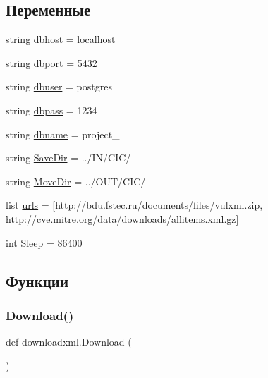 \subsection*{Переменные}
\begin{DoxyCompactItemize}
\item 
string \hyperlink{namespacedownloadxml_a75453296d7099653f232694ed5824b3f}{dbhost} = \textquotesingle{}localhost\textquotesingle{}
\item 
string \hyperlink{namespacedownloadxml_a32bdf9e8d022578666b5b9993714c4ef}{dbport} = \textquotesingle{}5432\textquotesingle{}
\item 
string \hyperlink{namespacedownloadxml_ae0187d21bda573cccc7c253c38ac9494}{dbuser} = \textquotesingle{}postgres\textquotesingle{}
\item 
string \hyperlink{namespacedownloadxml_af527b05230cf500f27f1a899351d60af}{dbpass} = \textquotesingle{}1234\textquotesingle{}
\item 
string \hyperlink{namespacedownloadxml_ab0bd228b1313bba2e1fe1caa883e5b6c}{dbname} = \textquotesingle{}project\+\_\textquotesingle{}
\item 
string \hyperlink{namespacedownloadxml_ac658e5e8b5ee862abc49621fce2f449a}{Save\+Dir} = \textquotesingle{}../IN/C\+IC/\textquotesingle{}
\item 
string \hyperlink{namespacedownloadxml_ae93409e2d65411e5e0c56c338629a095}{Move\+Dir} = \textquotesingle{}../O\+UT/C\+IC/\textquotesingle{}
\item 
list \hyperlink{namespacedownloadxml_a89324d9cb91e8b04605a33cb8a959ac9}{urls} = \mbox{[}\textquotesingle{}http\+://bdu.\+fstec.\+ru/documents/files/vulxml.\+zip\textquotesingle{}, \textquotesingle{}http\+://cve.\+mitre.\+org/data/downloads/allitems.\+xml.\+gz\textquotesingle{}\mbox{]}
\item 
int \hyperlink{namespacedownloadxml_a664dcd7a63115699604c60cc1c94b6db}{Sleep} = 86400
\end{DoxyCompactItemize}


\subsection{Функции}
\mbox{\label{namespacedownloadxml_a801fc32a7254a9319cb06fb65fb757e9}} 
\subsubsection{\texorpdfstring{Download()}{Download()}}
{\footnotesize\ttfamily def downloadxml.\+Download (\begin{DoxyParamCaption}{ }\end{DoxyParamCaption})}



